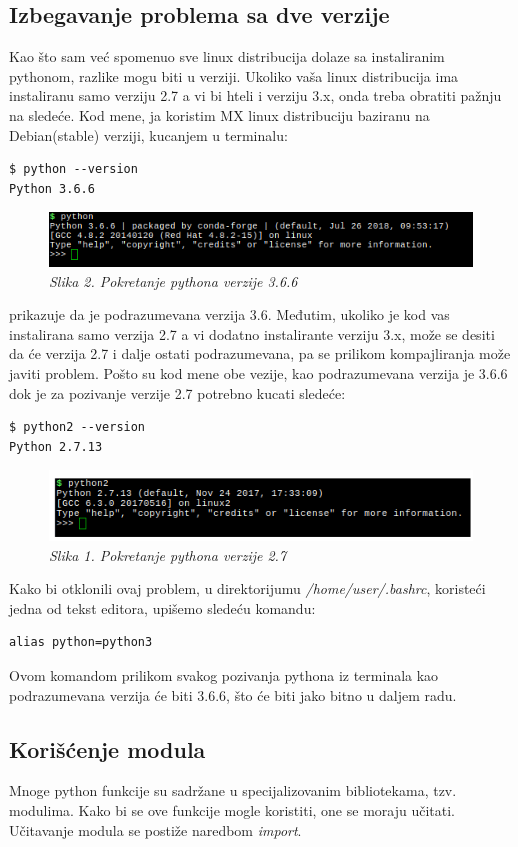 \documentclass[12pt]{article}
\begin{document}
\subsection{Izbegavanje problema sa dve verzije}
Kao što sam već spomenuo sve linux distribucija dolaze sa instaliranim pythonom, razlike mogu biti u verziji. Ukoliko vaša linux distribucija ima instaliranu samo verziju 2.7 a vi bi hteli i verziju 3.x, onda treba obratiti pažnju na sledeće. Kod mene, ja koristim MX linux distribuciju baziranu na Debian(stable) verziji, kucanjem u terminalu:
\begin{lstlisting}
$ python --version
Python 3.6.6
\end{lstlisting}  
\begin{figure}[h!]
\centering
\includegraphics[width=1.\linewidth]{python3.png}
\caption*{\textsl{Slika 2. Pokretanje pythona verzije 3.6.6}}
\end{figure}
prikazuje da je podrazumevana verzija 3.6. Međutim, ukoliko je kod vas instalirana samo verzija 2.7 a vi dodatno instalirante verziju 3.x, može se desiti da će verzija 2.7 i dalje ostati podrazumevana, pa se prilikom kompajliranja može javiti problem. Pošto su kod mene obe vezije, kao podrazumevana verzija je 3.6.6 dok je za pozivanje verzije 2.7 potrebno kucati sledeće:
\begin{lstlisting}
$ python2 --version
Python 2.7.13
\end{lstlisting}
\begin{figure}[h!]
\centering
\includegraphics[width=1.\linewidth]{python2.png}
\caption*{\textsl{Slika 1. Pokretanje pythona verzije 2.7}}
\end{figure}
  Kako bi otklonili ovaj problem, u direktorijumu \textsl{/home/user/.bashrc}, koristeći jedna od tekst editora, upišemo sledeću komandu:
\begin{lstlisting}
alias python=python3
\end{lstlisting}  
Ovom komandom prilikom svakog pozivanja pythona iz terminala kao podrazumevana verzija će biti 3.6.6, što će biti jako bitno u daljem radu.
\subsection{Korišćenje modula}
Mnoge python funkcije su sadržane u specijalizovanim bibliotekama, tzv. modulima. Kako bi se ove funkcije mogle koristiti, one se moraju učitati. Učitavanje modula se postiže naredbom \textsl{import}. 
\end{document}
